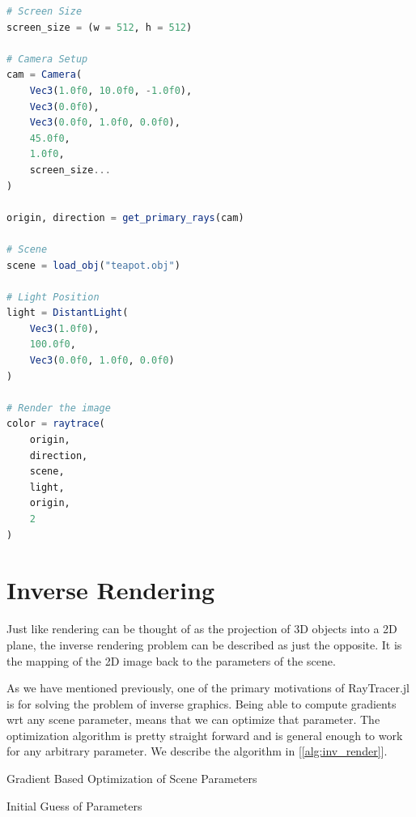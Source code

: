 \documentclass{juliacon}
\begin{document}
\begin{lstlisting}[caption = {Rendering the Utah Teapot Model},
                   label = {lst:example_render},
                   captionpos = b,
                   language = Julia]
# Screen Size
screen_size = (w = 512, h = 512)
    
# Camera Setup
cam = Camera(
    Vec3(1.0f0, 10.0f0, -1.0f0),
    Vec3(0.0f0),
    Vec3(0.0f0, 1.0f0, 0.0f0),
    45.0f0,
    1.0f0,
    screen_size...
)
                 
origin, direction = get_primary_rays(cam)
    
# Scene
scene = load_obj("teapot.obj")
    
# Light Position
light = DistantLight(
    Vec3(1.0f0),
    100.0f0,
    Vec3(0.0f0, 1.0f0, 0.0f0)
)
                         
# Render the image
color = raytrace(
    origin,
    direction,
    scene,
    light,
    origin,
    2
)
\end{lstlisting}

\section{Inverse Rendering}

Just like rendering can be thought of as the projection of 3D objects into a 2D plane, the inverse rendering problem can be described as just the opposite. It is the mapping of the 2D image back to the parameters of the scene.

As we have mentioned previously, one of the primary motivations of RayTracer.jl is for solving the problem of inverse graphics. Being able to compute gradients wrt any scene parameter, means that we can optimize that parameter. The optimization algorithm is pretty straight forward and is general enough to work for any arbitrary parameter. We describe the algorithm in [\ref{alg:inv_render}].

\begin{algorithm}[!htb]
    \caption{Gradient Based Optimization of Scene Parameters}
    \label{alg:inv_render}
    \SetAlgoLined
    Initial Guess of Parameters\;
\end{algorithm}
\end{document}
